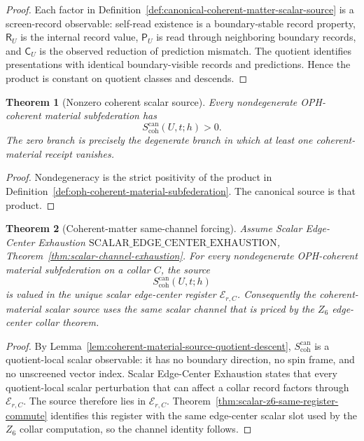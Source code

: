 \documentclass[11pt]{article}
\newtheorem{theorem}{Theorem}[section]
\theoremstyle{remark}
\theoremstyle{plain}
\begin{document}
\begin{proof}
Each factor in
Definition~\ref{def:canonical-coherent-matter-scalar-source} is a screen-record
observable: self-read existence is a boundary-stable record property,
\(\mathsf R_U\) is the internal record value, \(\mathsf P_U\) is read through
neighboring boundary records, and \(\mathsf C_U\) is the observed reduction of
prediction mismatch.  The quotient identifies presentations with identical
boundary-visible records and predictions.  Hence the product is constant on
quotient classes and descends.
\end{proof}

\begin{theorem}[Nonzero coherent scalar source]
\label{thm:nonzero-coherent-scalar-source}
Every nondegenerate OPH-coherent material subfederation has
\[
  S_{\mathrm{coh}}^{\mathrm{can}}(U,t;h)>0 .
\]
The zero branch is precisely the degenerate branch in which at least one
coherent-material receipt vanishes.
\end{theorem}

\begin{proof}
Nondegeneracy is the strict positivity of the product in
Definition~\ref{def:oph-coherent-material-subfederation}.  The canonical source
is that product.
\end{proof}

\begin{theorem}[Coherent-matter same-channel forcing]
\label{thm:coherent-matter-same-channel-forcing}
Assume Scalar Edge-Center Exhaustion
\(\mathrm{SCALAR\_EDGE\_CENTER\_EXHAUSTION}\),
Theorem~\ref{thm:scalar-channel-exhaustion}.  For every nondegenerate
OPH-coherent material subfederation on a collar \(C\), the source
\[
  S_{\mathrm{coh}}^{\mathrm{can}}(U,t;h)
\]
is valued in the unique scalar edge-center register \(\mathcal E_{r,C}\).
Consequently the coherent-material scalar source uses the same scalar channel
that is priced by the \(Z_6\) edge-center collar theorem.
\end{theorem}

\begin{proof}
By Lemma~\ref{lem:coherent-material-source-quotient-descent},
\(S_{\mathrm{coh}}^{\mathrm{can}}\) is a quotient-local scalar observable: it has
no boundary direction, no spin frame, and no unscreened vector index.  Scalar
Edge-Center Exhaustion states that every quotient-local scalar perturbation that
can affect a collar record factors through \(\mathcal E_{r,C}\).  The source
therefore lies in \(\mathcal E_{r,C}\).  Theorem~\ref{thm:scalar-z6-same-register-commute}
identifies this register with the same edge-center scalar slot used by the
\(Z_6\) collar computation, so the channel identity follows.
\end{proof}
\end{document}

